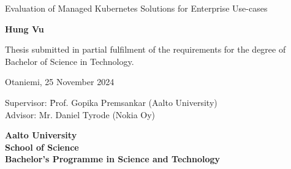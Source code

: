 {\parindent0pt %
\begin{spacing}{1.1}

 {\sffamily{}}
\end{spacing}

\vspace{12.7mm}

\begin{spacing}{1.63}
{\fontsize{17.8pt}{17.8pt}\selectfont Evaluation of Managed Kubernetes Solutions for Enterprise Use-cases}
\end{spacing}

\vspace{10.5mm}

\begin{spacing}{1.2}
{\fontsize{13pt}{13pt}\selectfont }
\end{spacing}

\vspace{10.6mm}

{\fontsize{13.9pt}{13.9pt}\bfseries\sffamily\lsstyle Hung Vu}

\vfill

{\fontsize{10.3pt}{10.3pt}\sffamily\lsstyle\raggedright
\begin{spacing}{1.06}

Thesis submitted in partial fulfilment of the requirements for the
degree of Bachelor of Science in Technology.

Otaniemi, 25 November 2024

\begin{tabbing}
Supervisor:\hspace{6mm} \= Prof. Gopika Premsankar (Aalto University) \\
Advisor: \> Mr. Daniel Tyrode (Nokia Oy)
\end{tabbing}
\vspace{-4mm}
\end{spacing}
} %

\vspace{11.5mm}

\begin{spacing}{.9}
{\bfseries\sffamily\lsstyle Aalto University \\
School of Science \\
Bachelor’s Programme in Science and Technology}
\end{spacing}
} %




